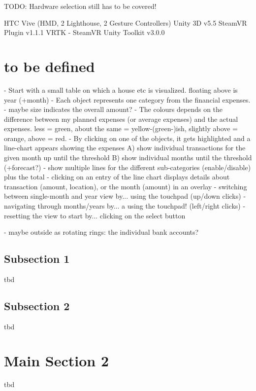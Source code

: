 TODO: Hardware selection still has to be covered!

HTC Vive (HMD, 2 Lighthouse, 2 Gesture Controllers)
Unity 3D v5.5
SteamVR Plugin v1.1.1		\cite{Valve2016a}
VRTK - SteamVR Unity Toolkit v3.0.0			\cite{Sysdia2017}


\section{to be defined}



- Start with a small table on which a house etc is visualized. floating above is year (+month)
- Each object represents one category from the financial expenses.
- maybe size indicates the overall amount?
- The colours depends on the difference between my planned expenses (or average expenses) and the actual expenses. less = green, about the same = yellow-(green-)ish, slightly above = orange, above = red.
- By clicking on one of the objects, it gets highlighted and a line-chart appears showing the expenses
A) show individual transactions for the given month up until the threshold
B) show individual months until the threshold (+forecast?)
- show multiple lines for the different sub-categories (enable/disable) plus the total
- clicking on an entry of the line chart displays details about transaction (amount, location), or the month (amount) in an overlay
- switching between single-month and year view by... using the touchpad (up/down clicks)
- navigating through months/years by... a using the touchpad! (left/right clicks)
- resetting the view to start by... clicking on the select button

- maybe outside as rotating rings: the individual bank accounts?




\subsection{Subsection 1}

tbd



\subsection{Subsection 2}

tbd



\section{Main Section 2}

tbd